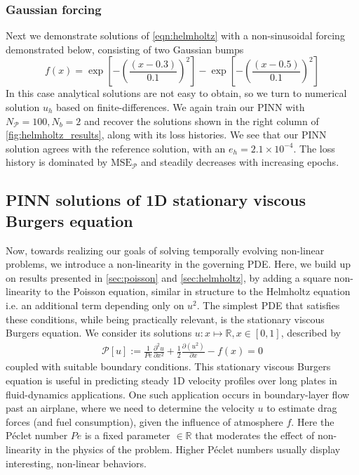 \documentclass[11pt]{article}
\newcommand{\mse}{\textrm{MSE}}
\newcommand{\pde}{\ensuremath{\mathcal{P}}}
\begin{document}
\subsubsection{Gaussian forcing}
\label{sec:orgc64cb81}
Next we demonstrate solutions of \cref{eqn:helmholtz} with a non-sinusoidal
forcing demonstrated below, consisting of two Gaussian bumps
\[ f(x) = \exp\left[-\left(\frac{(x - 0.3)}{0.1}\right)^2\right] -  \exp\left[-\left(\frac{(x -
   0.5)}{0.1}\right)^2\right] \]
In this case analytical solutions are not easy to obtain, so we turn to numerical
solution \({u}_h\) based on finite-differences. We again train our PINN with
\(N_\pde = 100 , N_b = 2\) and recover the solutions
shown in the right column of \cref{fig:helmholtz_results}, along with its loss
histories. We see that our PINN solution agrees with the reference solution,
with an \(e_h = 2.1 \times 10^{-4}\). The loss history is dominated by \(\mse_\pde\) and steadily decreases with increasing epochs.

\subsection{PINN solutions of 1D stationary viscous Burgers equation}
\label{sec:stationary_burgers}
Now, towards realizing our goals of solving temporally evolving non-linear
problems, we introduce a non-linearity in the governing PDE. Here, we build
up on results presented in \cref{sec:poisson} and \cref{sec:helmholtz}, by adding
a square non-linearity to the Poisson equation, similar in structure to the Helmholtz
equation i.e. an additional term depending only on \(u^2\). The simplest
PDE that satisfies these conditions, while being practically relevant, is the
stationary viscous Burgers equation. We consider its solutions \(u : x
   \mapsto \mathbb{R}, x \in [0, 1]\), described by
\begin{equation}
\label{eqn:stationary_burgers}
\begin{aligned}
	 \pde[ u ] := \frac{1}{Pe}\frac{\partial^2 u}{\partial x^2} + \frac{1}{2}\frac{\partial \left(u^2\right)}{\partial x} - f(x) = 0
\end{aligned}
\end{equation}
coupled with suitable boundary conditions. This stationary viscous Burgers
equation is useful in predicting steady 1D velocity profiles over long plates
in fluid-dynamics applications. One
such application occurs in boundary-layer flow past an airplane, where we need to determine
the velocity \(u\) to estimate drag forces (and fuel consumption), given
the influence of atmosphere \(f\). Here the Péclet number \(Pe\) is
a fixed parameter \(\in \mathbb{R}\) that moderates the effect of
non-linearity in the physics of the problem. Higher Péclet numbers usually
display interesting, non-linear behaviors.
\end{document}
